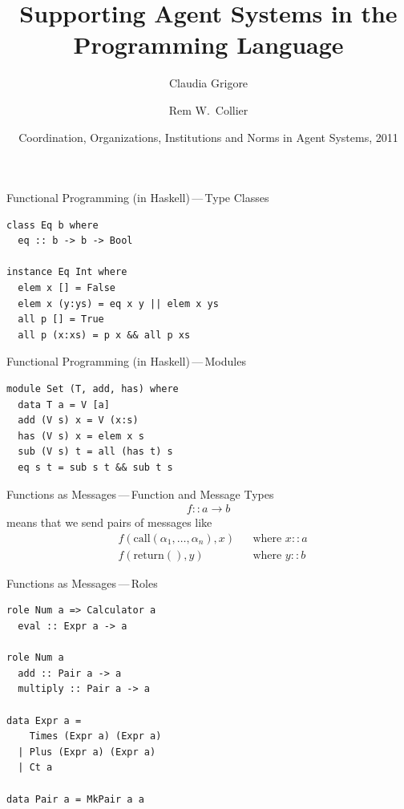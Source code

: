 \documentclass{beamer}
\title{Supporting Agent Systems in the Programming Language}
\author{Claudia Grigore \and Rem W.~Collier}
\institute{
  School of Computer Science\\
  University College Dublin}
\date[COIN~2011]{Coordination, Organizations, Institutions and Norms
  in Agent Systems, 2011}
\begin{document}
\begin{frame}
  \titlepage
\end{frame}

\begin{frame}[fragile]{Functional Programming (in Haskell)\,---\,Type Classes}

\begin{lstlisting}
class Eq b where
  eq :: b -> b -> Bool

instance Eq Int where
  elem x [] = False
  elem x (y:ys) = eq x y || elem x ys
  all p [] = True
  all p (x:xs) = p x && all p xs
\end{lstlisting}
\end{frame}

\begin{frame}[fragile]{Functional Programming (in Haskell)\,---\,Modules}
\begin{lstlisting}
module Set (T, add, has) where
  data T a = V [a]
  add (V s) x = V (x:s)
  has (V s) x = elem x s
  sub (V s) t = all (has t) s
  eq s t = sub s t && sub t s
\end{lstlisting}
\end{frame}

\begin{frame}[fragile]{Functions as Messages\,---\,Function and Message Types}
\begin{align*}
f :: a \to b
\end{align*}
means that we send pairs of messages like
\begin{align*}
&f(\mathrm{call}(\alpha_1,\ldots,\alpha_n), x) &&\text{where $x::a$}\\
&f(\mathrm{return}(),y) &&\text{where $y::b$}
\end{align*}
\end{frame}

\begin{frame}[fragile]{Functions as Messages\,---\,Roles}
\begin{lstlisting}
role Num a => Calculator a
  eval :: Expr a -> a

role Num a
  add :: Pair a -> a
  multiply :: Pair a -> a

data Expr a =
    Times (Expr a) (Expr a)
  | Plus (Expr a) (Expr a)
  | Ct a

data Pair a = MkPair a a
\end{lstlisting}
\end{frame}
\end{document}
